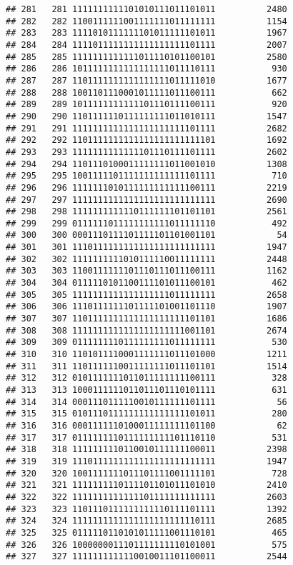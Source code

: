\documentclass[]{article}
\begin{document}
\begin{verbatim}
## 281   281 1111111111101010111011101011          2480
## 282   282 1100111111001111111011111111          1154
## 283   283 1111010111111101011111101011          1967
## 284   284 1111011111111111111111101111          2007
## 285   285 1111111111111011110101100101          2580
## 286   286 1011111111111111111011110111           930
## 287   287 1101111111111111111011111010          1677
## 288   288 1001101110001011111011100111           662
## 289   289 1011111111111101110111100111           920
## 290   290 1101111110111111111011010111          1547
## 291   291 1111111111111111111111101111          2682
## 292   292 1101111111111111111111111101          1692
## 293   293 1111111111111101110111101111          2602
## 294   294 1101110100011111111011001010          1308
## 295   295 1001111101111111111111101111           710
## 296   296 1111111010111111111111100111          2219
## 297   297 1111111111111111111111111111          2690
## 298   298 1111111111110111111101101101          2561
## 299   299 0111111011111111111011111110           492
## 300   300 0001110111101111101101001101            54
## 301   301 1110111111111111111111111111          1947
## 302   302 1111111111010111110011111111          2448
## 303   303 1100111111101110111011100111          1162
## 304   304 0111110101100111101011100101           462
## 305   305 1111111111111111111011111111          2658
## 306   306 1110111111101111101001101110          1907
## 307   307 1101111111111111111111101101          1686
## 308   308 1111111111111111111111001101          2674
## 309   309 0111111110111111111011111111           530
## 310   310 1101011110001111111011101000          1211
## 311   311 1101111110011111111011101101          1514
## 312   312 0101111111011011111111100111           328
## 313   313 1000111111011011101110101111           631
## 314   314 0001110111110010111111101111            56
## 315   315 0101110111111111111111101011           280
## 316   316 0001111110100011111111101100            62
## 317   317 0111111110111111111101110110           531
## 318   318 1111111110110010111111100011          2398
## 319   319 1110111111111111111111111111          1947
## 320   320 1001111111011101111001111101           728
## 321   321 1111111110111101101011101010          2410
## 322   322 1111111111111101111111111111          2603
## 323   323 1101110111111111110111101111          1392
## 324   324 1111111111111111111111110111          2685
## 325   325 0111110110101011111001110101           465
## 326   326 1000000011101111111110101001           575
## 327   327 1111111111110010011101100011          2544

\end{verbatim}
\end{document}
